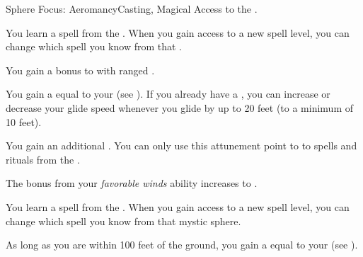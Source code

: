     \begin{feat}{Sphere Focus: Aeromancy}{Casting, Magical}
        \featpre Access to the  .

         You learn a spell from the  .
        When you gain access to a new spell level, you can change which spell you know from that .

         You gain a  bonus to  with ranged .

         You gain a  equal to your  (see ).
        If you already have a , you can increase or decrease your glide speed whenever you glide by up to 20 feet (to a minimum of 10 feet).

         You gain an additional .
        You can only use this attunement point to  to spells and rituals from the  .

         The bonus from your \textit{favorable winds} ability increases to .

         You learn a spell from the  .
        When you gain access to a new spell level, you can change which spell you know from that mystic sphere.

         As long as you are within 100 feet of the ground, you gain a  equal to your  (see ).
    \end{feat}

